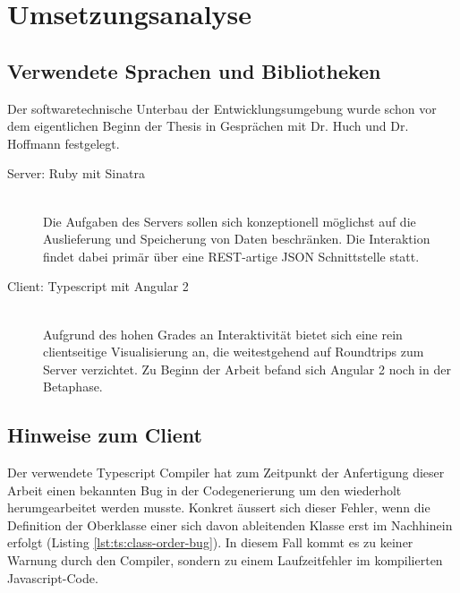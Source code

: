 \section{Umsetzungsanalyse}
\label{sec:implementation-analysis}


\subsection{Verwendete Sprachen und Bibliotheken}

Der softwaretechnische Unterbau der Entwicklungsumgebung wurde schon vor dem eigentlichen Beginn der Thesis in Gesprächen mit Dr. Huch und Dr. Hoffmann festgelegt.

\begin{description}
\item[Server: Ruby mit Sinatra] \hfill\\
  Die Aufgaben des Servers sollen sich konzeptionell möglichst auf die Auslieferung und Speicherung von Daten beschränken. Die Interaktion findet dabei primär über eine REST-artige JSON Schnittstelle statt.
\item[Client: Typescript mit Angular 2] \hfill\\
  Aufgrund des hohen Grades an Interaktivität bietet sich eine rein clientseitige Visualisierung an, die weitestgehend auf Roundtrips zum Server verzichtet. Zu Beginn der Arbeit befand sich Angular 2 noch in der Betaphase.
\end{description}

\subsection{Hinweise zum Client}

Der verwendete Typescript Compiler hat zum Zeitpunkt der Anfertigung dieser Arbeit einen bekannten Bug in der Codegenerierung \cite{ts-compiler-class-order-bug} um den wiederholt herumgearbeitet werden musste. Konkret äussert sich dieser Fehler, wenn die Definition der Oberklasse einer sich davon ableitenden Klasse erst im Nachhinein erfolgt (Listing \ref{lst:ts:class-order-bug}). In diesem Fall kommt es zu keiner Warnung durch den Compiler, sondern zu einem Laufzeitfehler im kompilierten Javascript-Code.



